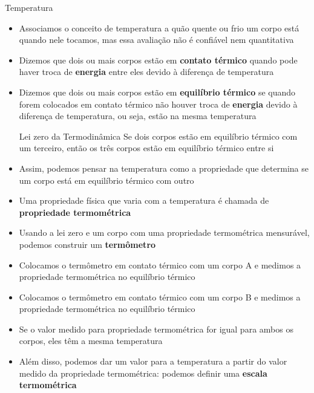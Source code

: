 \documentclass[t,%
brazilian,%
11pt,%
aspectratio=169,%
table%
]{beamer}
\begin{document}
\begin{frame}{Temperatura} 
    \begin{itemize} 
        \item Associamos o conceito de temperatura a quão quente ou frio um corpo está quando nele
            tocamos, mas essa avaliação não é confiável nem quantitativa 
        \item Dizemos que dois ou mais corpos estão em \textbf{contato térmico} quando
            pode haver troca de \textbf{energia} entre eles devido à diferença de
            temperatura 
        \item Dizemos que dois ou mais corpos estão em
            \textbf{equilíbrio térmico} se quando forem colocados em contato térmico
            não houver troca de \textbf{energia} devido à diferença de temperatura, ou
            seja, estão na mesma temperatura 
            \begin{block}{Lei zero da Termodinâmica} 
                Se dois corpos estão em equilíbrio térmico com um terceiro,
                então os três corpos estão em equilíbrio térmico entre si 
            \end{block} \pause
        \item Assim, podemos pensar na temperatura como a propriedade que determina se
            um corpo está em equilíbrio térmico com outro 
    \end{itemize} 
\end{frame}
%
\begin{frame}
    \begin{itemize}
        \item Uma propriedade física que varia com a temperatura é chamada de
            \textbf{propriedade termométrica}
        \item Usando a lei zero e um corpo com uma propriedade termométrica
            mensurável, podemos construir um \textbf{termômetro}
        \item Colocamos o termômetro em contato térmico com um corpo A e
            medimos a propriedade termométrica no equilíbrio térmico
        \item Colocamos o termômetro em contato térmico com um corpo B e
            medimos a propriedade termométrica no equilíbrio térmico
        \item Se o valor medido para propriedade termométrica for igual para
            ambos os corpos, eles têm a mesma temperatura
        \item Além disso, podemos dar um valor para a temperatura a partir do
            valor medido da propriedade termométrica: podemos definir uma
            \textbf{escala termométrica}
    \end{itemize}
\end{frame}
\end{document}

